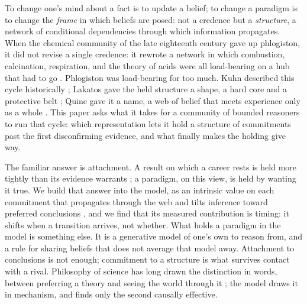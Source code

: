 To change one's mind about a fact is to update a belief; to change a paradigm is to change
the \emph{frame} in which beliefs are posed: not a credence but a \emph{structure}, a
network of conditional dependencies through which information propagates. When the chemical
community of the late eighteenth century gave up phlogiston, it did not revise a single
credence: it rewrote a network in which combustion, calcination, respiration, and the theory
of acids were all load-bearing on a hub that had to go
\citep{blumenthal2017,holmes2000,boantza2011}. Phlogiston was load-bearing for too much.
Kuhn described this cycle historically \citep{kuhn1962}; Lakatos gave the held structure a
shape, a hard core and a protective belt \citep{lakatos1970}; Quine gave it a name, a web of
belief that meets experience only as a whole \citep{quine1951}. This paper asks what it
takes for a community of bounded reasoners to run that cycle: which representation lets it
hold a structure of commitments past the first disconfirming evidence, and what finally
makes the holding give way.

The familiar answer is attachment. A result on which a career rests is held more tightly
than its evidence warrants \citep{kitcher1990,strevens2003}; a paradigm, on this view, is
held by wanting it true. We build that answer into the model, as an intrinsic value on each
commitment that propagates through the web and tilts inference toward preferred conclusions
\citep{hyland2025}, and we find that its measured contribution is timing: it shifts when a
transition arrives, not whether. What holds a paradigm in the model is something else. It is
a generative model of one's own to reason from, and a rule for sharing beliefs that does not
average that model away. Attachment to conclusions is not enough; commitment to a structure
is what survives contact with a rival. Philosophy of science has long drawn the distinction
in words, between preferring a theory and seeing the world through it
\citep{kuhn1962,feyerabend1975}; the model draws it in mechanism, and finds only the second
causally effective.

